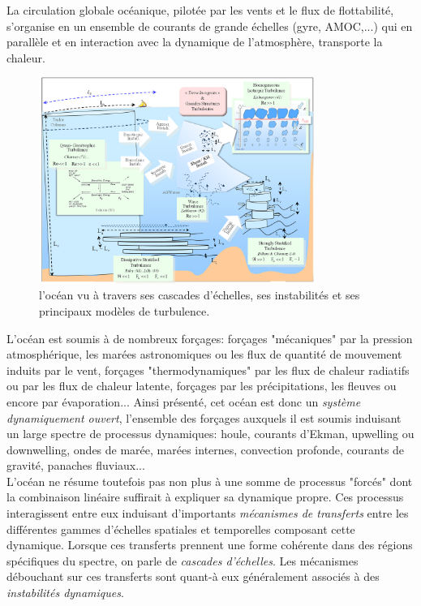 La circulation globale océanique, pilotée par les vents et le flux de flottabilité, s'organise en un ensemble de courants de grande échelles (gyre, AMOC,...) qui en parallèle et en interaction avec la dynamique de l'atmosphère, transporte la chaleur. \\
\begin{figure}[!h]
  \centering
  \includegraphics[width=0.8\textwidth]{./INTRO/Ocean_scales.png}
  \caption{\color{red}l'océan vu à travers ses cascades d'échelles, ses instabilités et ses principaux modèles de turbulence.\color{black}}
  \label{fig_ocean_scales}
\end{figure}
\color{blue}
L'océan est soumis à de nombreux forçages: forçages "mécaniques" par la pression atmosphérique, les marées astronomiques ou les flux de quantité de mouvement induits par le vent, forçages "thermodynamiques" par les flux de chaleur radiatifs ou par les flux de chaleur latente, forçages par les précipitations, les fleuves ou encore par évaporation... Ainsi présenté, cet océan est donc un \textit{système dynamiquement ouvert}, l'ensemble des forçages auxquels il est soumis induisant un large spectre de processus dynamiques: houle, courants d'Ekman, upwelling ou downwelling, ondes de marée, marées internes, convection profonde, courants de gravité, panaches fluviaux... \\
L'océan ne résume toutefois pas non plus à une somme de processus "forcés" dont la combinaison linéaire suffirait à expliquer sa dynamique propre. Ces processus interagissent entre eux induisant d'importants \textit {mécanismes de transferts} entre les différentes gammes d'échelles spatiales et temporelles composant cette dynamique. Lorsque ces transferts prennent une forme cohérente dans des régions spécifiques du spectre, on parle de \textit{cascades d'échelles}. Les mécanismes débouchant sur ces transferts sont quant-à eux généralement associés à des \textit{instabilités dynamiques}.\\
